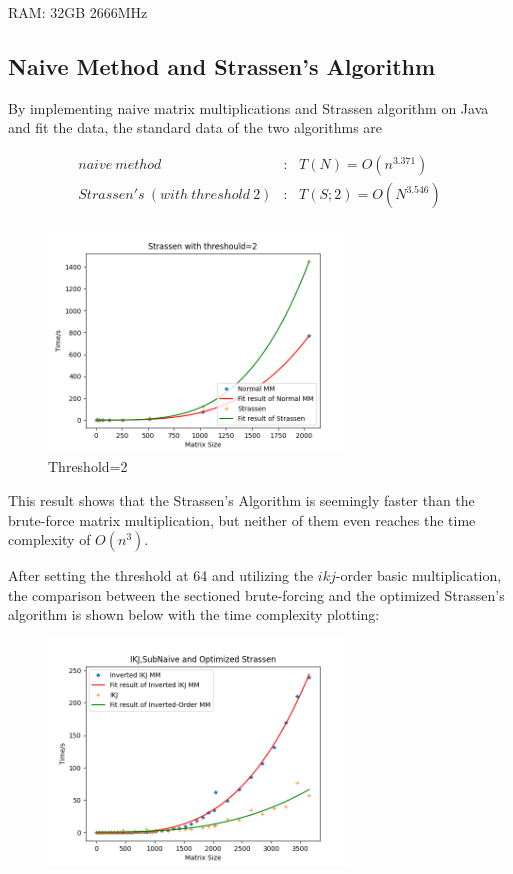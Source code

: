 \documentclass[UTF8]{ctexart}
\begin{document}
RAM: 32GB 2666MHz

\subsection{Naive Method and Strassen's Algorithm}
\label{subsec::NMaSAl}

By implementing naive matrix multiplications and Strassen algorithm on
Java and fit the data, the standard data of the two algorithms are

\begin{equation}
  \begin{aligned}
    naive\ method                    & :\ \ \ T(N)=O(n^{3.371})   \\
    Strassen's\ (with\ threshold\ 2) & :\ \ \ T(S;2)=O(N^{3.546})
  \end{aligned}
\end{equation}

\begin{figure}[htb]
  \centering
  \includegraphics[height=6.0cm]{../ppt/slide-UIBK/th=2.png}
  \caption{Threshold=2}
\end{figure}

This result shows that the Strassen's Algorithm is seemingly faster than
the brute-force matrix multiplication, but neither of them even reaches
the time complexity of \(O(n^3)\).

After setting the threshold at 64 and utilizing the \(ikj\)-order basic multiplication, the comparison between the sectioned brute-forcing and the optimized Strassen's algorithm is shown below with the time complexity plotting:
\begin{figure}[htb]
  \begin{center}
    \includegraphics[height=6.0cm]{../ppt/slide-UIBK/naive_strassen_comp.png}
  \end{center}
\end{figure}
\end{document}
